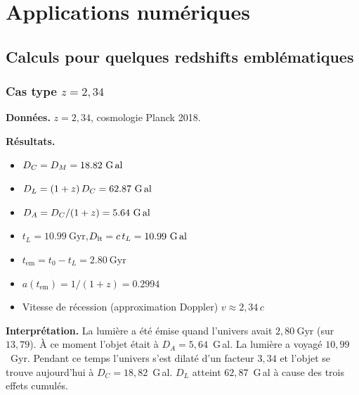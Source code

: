 \documentclass[11pt,a4paper,openany]{report}
\newcommand{\Gly}{\text{G\,al}}
\newcommand{\Gyr}{\text{Gyr}}
\begin{document}
\clearpage

\part{Applications numériques}

\chapter{Calculs pour quelques redshifts emblématiques}

\section{Cas type \texorpdfstring{$z=2{,}34$}{z=2.34}}

\begin{tcolorbox}[numerique]
\textbf{Données.} $z=2{,}34$, cosmologie Planck 2018.

\medskip
\noindent\textbf{Résultats.}
\begin{itemize}[topsep=2pt]
  \item $D_{C} = D_{M} = \num{18.82}~\Gly$
  \item $D_{L} = (1+z)\,D_{C} = \num{62.87}~\Gly$
  \item $D_{A} = D_{C}/(1+z) = \num{5.64}~\Gly$
  \item $t_{L} = \num{10.99}~\Gyr$,\quad $D_{\text{lt}} = c\,t_{L} = \num{10.99}~\Gly$
  \item $t_{\text{em}} = t_{0} - t_{L} = \num{2.80}~\Gyr$
  \item $a(t_{\text{em}}) = 1/(1+z) = \num{0.2994}$
  \item Vitesse de récession (approximation Doppler) $v \approx 2{,}34\,c$
\end{itemize}

\medskip
\noindent\textbf{Interprétation.} La lumière a été émise quand l'univers avait
$2{,}80~\Gyr$ (sur $13{,}79$). À ce moment l'objet était à $D_{A}=5{,}64$~G\,al.
La lumière a voyagé $10{,}99$~Gyr. Pendant ce temps l'univers s'est dilaté
d'un facteur $3{,}34$ et l'objet se trouve aujourd'hui à $D_{C}=18{,}82$~G\,al.
$D_{L}$ atteint $62{,}87$~G\,al à cause des trois effets cumulés.
\end{tcolorbox}
\end{document}
